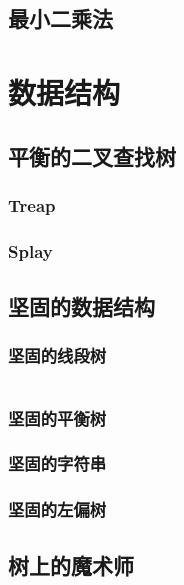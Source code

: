 \documentclass[a4paper]{article}
\newcommand{\cppcode}[1]{
    \inputminted[mathescape]{cpp}{source/#1}
}
\begin{document}
\subsection{最小二乘法}

\section{数据结构}

\subsection{平衡的二叉查找树}

\subsubsection{Treap}


\subsubsection{Splay}

\subsection{坚固的数据结构}

\subsubsection{坚固的线段树}

\cppcode{data-structure/persistent-segment-tree.cpp}

\subsubsection{坚固的平衡树}


\subsubsection{坚固的字符串}

\subsubsection{坚固的左偏树}

\subsection{树上的魔术师}
\end{document}
